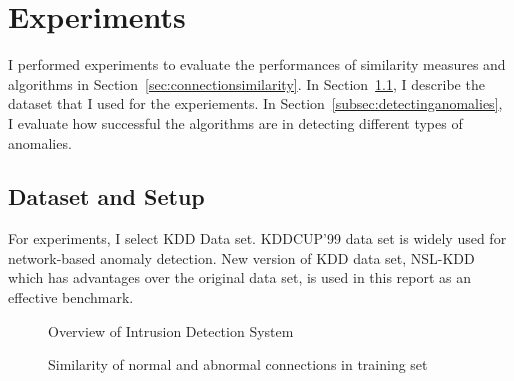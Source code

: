 \section{Experiments}
I performed experiments to evaluate the performances of similarity measures and algorithms in Section~\ref{sec:connectionsimilarity}.
\newline
In Section~\ref{subsec:datasetandsetup}, I describe the dataset that I used for the experiements.\newline
In Section~\ref{subsec:detectinganomalies}, I evaluate how successful the algorithms are in detecting different types of anomalies.

\subsection{Dataset and Setup}
\label{subsec:datasetandsetup}
For experiments, I select KDD Data set. 
KDDCUP'99 data set is widely used for network-based anomaly detection. 
New version of KDD data set, NSL-KDD which has advantages over the original data set, is used in this report as an effective benchmark.

\begin{figure}[htb2]
\begin{center}
\end{center}
\caption{Overview of Intrusion Detection System}
\label{fig:refSingleRobot1}
\end{figure}

\begin{figure}[htb2]
\begin{center}
\end{center}
\caption{Similarity of normal and abnormal connections in training set} %
\label{fig:refSingleRobot1}
\end{figure}

